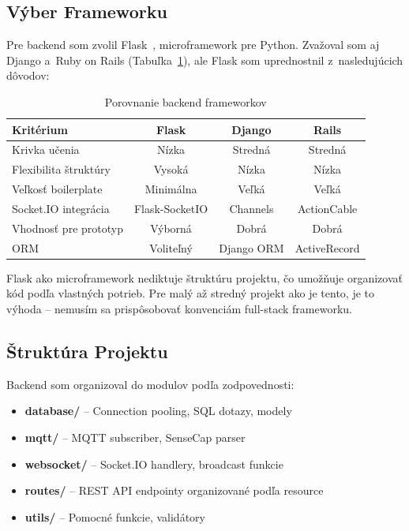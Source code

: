 \subsection{Výber Frameworku}
\label{sec:Flask}

Pre backend som zvolil Flask~\cite{flask_docs,grinberg_flask}, microframework pre Python. Zvažoval som aj Django a~Ruby on Rails (Tabuľka~\ref{tab:framework-comparison}), ale Flask som uprednostnil z~nasledujúcich dôvodov:

\begin{table}[htbp]
    \centering
    \begin{tabular}{|l|c|c|c|}
        \hline
        \textbf{Kritérium} & \textbf{Flask} & \textbf{Django} & \textbf{Rails} \\
        \hline
        Krivka učenia & Nízka & Stredná & Stredná \\
        Flexibilita štruktúry & Vysoká & Nízka & Nízka \\
        Veľkosť boilerplate & Minimálna & Veľká & Veľká \\
        Socket.IO integrácia & Flask-SocketIO & Channels & ActionCable \\
        Vhodnosť pre prototyp & Výborná & Dobrá & Dobrá \\
        ORM & Voliteľný & Django ORM & ActiveRecord \\
        \hline
    \end{tabular}
    \caption{Porovnanie backend frameworkov}
    \label{tab:framework-comparison}
\end{table}

Flask ako microframework nediktuje štruktúru projektu, čo umožňuje organizovať kód podľa vlastných potrieb. Pre malý až stredný projekt ako je tento, je to výhoda -- nemusím sa prispôsobovať konvenciám full-stack frameworku.

\subsection{Štruktúra Projektu}
\label{sec:ProjektStruktura}

Backend som organizoval do modulov podľa zodpovednosti:

\begin{itemize}
    \item \textbf{database/} -- Connection pooling, SQL dotazy, modely
    \item \textbf{mqtt/} -- MQTT subscriber, SenseCap parser
    \item \textbf{websocket/} -- Socket.IO handlery, broadcast funkcie
    \item \textbf{routes/} -- REST API endpointy organizované podľa resource
    \item \textbf{utils/} -- Pomocné funkcie, validátory
\end{itemize}

